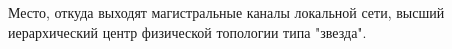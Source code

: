 Место, откуда выходят магистральные каналы локальной
сети, высший иерархический центр физической топологии типа "звезда".